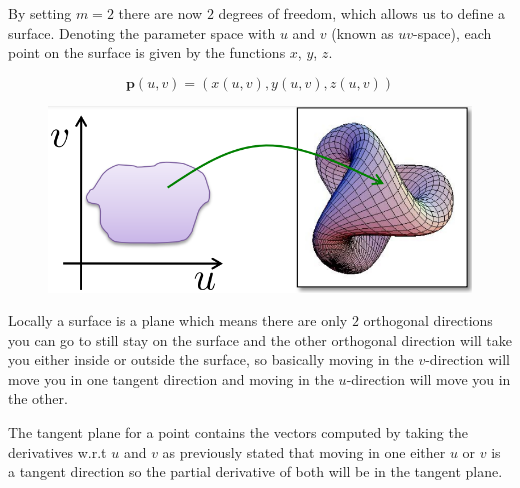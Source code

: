 \documentclass{article}
\begin{document}
By setting \(m=2\) there are now \(2\) degrees of freedom, which allows us to define a surface.
Denoting the parameter space with \(u\) and \(v\) (known as \(uv\)-space), each point on the
surface is given by the functions \(x\), \(y\), \(z\).

\[\mathbf{p}(u,v) = (x(u,v), y(u,v), z(u,v))\]

\begin{figure}[!ht]
    \centering
    \includegraphics[width=0.5\linewidth]{images/3d_surface.png}
\end{figure}

Locally a surface is a plane which means there are only \(2\) orthogonal directions you can go to 
still stay on the surface and the other orthogonal direction will take
you either inside or outside the surface, so basically moving in the \(v\)-direction will move
you in one tangent direction and moving in the \(u\)-direction will move you in the other.

\vspace{30px}

The tangent plane for a point contains the vectors computed by taking the derivatives
w.r.t \(u\) and \(v\) as previously stated that moving in one either \(u\) or \(v\) is a tangent direction
so the partial derivative of both will be in the tangent plane.

\vspace{5px}
\end{document}
